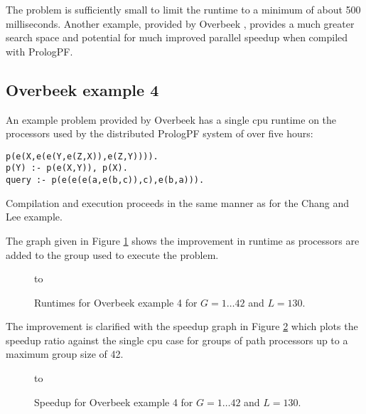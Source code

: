 The problem is sufficiently small to limit the runtime to a minimum of about 500
milliseconds.  Another example, provided by Overbeek \cite{DLO87}, provides a much
greater search space and potential for much improved parallel speedup when compiled
with PrologPF.

\subsection{Overbeek example 4}

An example problem provided by Overbeek \cite{DLO87} has a single cpu runtime on the
processors used by the distributed PrologPF system of over five hours:
\begin{verbatim}
p(e(X,e(e(Y,e(Z,X)),e(Z,Y)))).
p(Y) :- p(e(X,Y)), p(X).
query :- p(e(e(e(a,e(b,c)),c),e(b,a))).
\end{verbatim}
Compilation and execution proceeds in the same manner as for the Chang and Lee
example.

The graph given in Figure \ref{pttp_overbeek_L_130_runtime} shows the improvement in
runtime as processors are added to the group used to execute the problem.

\begin{figure}[htbp]
\vspace{5mm} \hbox to 
\caption{Runtimes for Overbeek example 4 for $G=1\ldots 42$ and $L=130$.}
\vspace{5mm}
\label{pttp_overbeek_L_130_runtime}
\end{figure}

The improvement is clarified with the speedup graph in
Figure \ref{pttp_overbeek_L_130_spdup} which plots the speedup ratio against the
single cpu case for groups of path processors up to a maximum group size of 42.

\begin{figure}[htbp]
\vspace{5mm} \hbox to 
\caption{Speedup for Overbeek example 4 for $G=1\ldots 42$ and $L=130$.}
\vspace{5mm}
\label{pttp_overbeek_L_130_spdup}
\end{figure}

